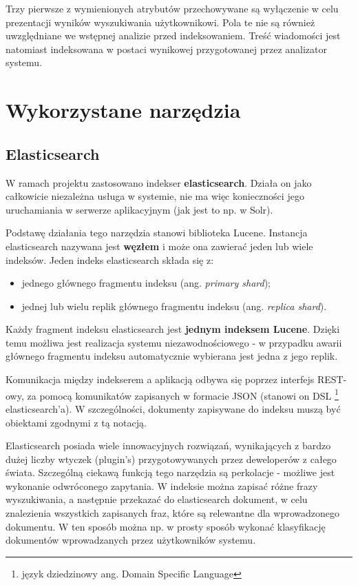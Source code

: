 \documentclass[runningheads]{llncs}
\begin{document}
Trzy pierwsze z wymienionych atrybutów przechowywane są wyłączenie w celu prezentacji wyników wyszukiwania 
użytkownikowi. Pola te nie są również uwzględniane we wstępnej analizie przed indeksowaniem. Treść wiadomości 
jest natomiast indeksowana w postaci wynikowej przygotowanej przez analizator systemu. 

\section{Wykorzystane narzędzia}
\label{sec:wykorzystane-narzedzia}

\subsection{Elasticsearch}

W ramach projektu zastosowano indekser \textbf{elasticsearch}. Działa on jako całkowicie 
niezależna usługa w systemie, nie ma więc konieczności jego uruchamiania w
serwerze aplikacyjnym  (jak jest to np. w Solr).

Podstawę działania tego narzędzia stanowi biblioteka Lucene. Instancja elasticsearch nazywana 
jest \textbf{węzłem} i może ona zawierać jeden lub wiele indeksów.
Jeden indeks elasticsearch składa się z:
\begin{itemize}
  \item jednego głównego fragmentu indeksu (ang. \emph{primary shard});
  \item jednej lub wielu replik głównego fragmentu indeksu (ang. \emph{replica shard}).
\end{itemize}
Każdy fragment indeksu elasticsearch jest \textbf{jednym indeksem Lucene}. Dzięki temu możliwa jest realizacja 
systemu niezawodnościowego - w przypadku awarii głównego fragmentu indeksu automatycznie wybierana jest jedna 
z jego replik. 

Komunikacja  między indekserem
a aplikacją odbywa się poprzez interfejs REST-owy, za pomocą  komunikatów
zapisanych w formacie JSON (stanowi on DSL \footnote{język dziedzinowy ang. Domain Specific Language} elasticsearch'a).
W szczególności, dokumenty zapisywane  do indeksu muszą być obiektami zgodnymi z tą notacją. 

Elasticsearch posiada wiele innowacyjnych rozwiązań,  wynikających z bardzo
dużej liczby wtyczek (plugin’s) przygotowywanych przez  deweloperów z całego
świata. Szczególną ciekawą funkcją tego narzędzia są perkolacje  -  możliwe jest
wykonanie odwróconego zapytania. W indeksie można zapisać różne  frazy
wyszukiwania, a następnie przekazać do elasticsearch dokument, w  celu
znalezienia wszystkich zapisanych fraz, które  są relewantne dla wprowadzonego
dokumentu. W ten sposób można np. w prosty sposób wykonać  klasyfikację
dokumentów wprowadzanych przez użytkowników systemu.
\end{document}
